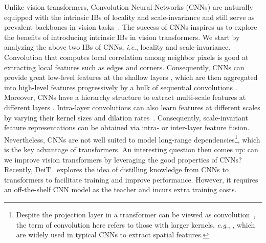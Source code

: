 \documentclass[twocolumn]{svjour3}          \smartqed  \usepackage{natbib}
\newcommand{\ie}{i.e}
\newcommand{\eg}{e.g}
\def\onedot{.\xspace}
\def\eg{\emph{e.g}\onedot}
\def\ie{\emph{i.e}\onedot}
\begin{document}
Unlike vision transformers, Convolution Neural Networks (CNNs) are naturally equipped with the intrinsic IBs of locality and scale-invariance and still serve as prevalent backbones in vision tasks~\citep{he2016deep,szegedy2017inception,chen2017rethinking,zhao2017pyramid}. The success of CNNs inspires us to explore the benefits of introducing intrinsic IBs in vision transformers. We start by analyzing the above two IBs of CNNs, \ie, locality and scale-invariance. Convolution that computes local correlation among neighbor pixels is good at extracting local features such as edges and corners. Consequently, CNNs can provide great low-level features at the shallow layers \citep{zeiler2014visualizing}, which are then aggregated into high-level features progressively by a bulk of sequential convolutions \citep{huang2017densely,simonyan2014very,szegedy2015going}. Moreover, CNNs have a hierarchy structure to extract multi-scale features at different layers \citep{simonyan2014very,krizhevsky2012imagenet,he2016deep}. Intra-layer convolutions can also learn features at different scales by varying their kernel sizes and dilation rates~\citep{he2015spatial,szegedy2017inception,chen2017rethinking,lin2017feature,zhao2017pyramid}. Consequently, scale-invariant feature representations can be obtained via intra- or inter-layer feature fusion. Nevertheless, CNNs are not well suited to model long-range dependencies\footnote{Despite the projection layer in a transformer can be viewed as  convolution~\citep{chen2021empirical}, the term of convolution here refers to those with larger kernels, \eg, , which are widely used in typical CNNs to extract spatial features.}, which is the key advantage of transformers. An interesting question then comes up: can we improve vision transformers by leveraging the good properties of CNNs? Recently, DeiT~\citep{touvron2020training} explores the idea of distilling knowledge from CNNs to transformers to facilitate training and improve performance. However, it requires an off-the-shelf CNN model as the teacher and incurs extra training costs.
\end{document}
